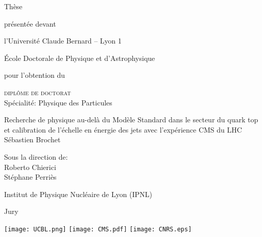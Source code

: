 \begin{titlepage}

\begin{center}
{\Large Thèse\\}

\vspace{1em}

{\small présentée devant\\}

\vspace{1em}

{\Large l'Université Claude Bernard -- Lyon 1\\

\vspace{0.2em}

École Doctorale de Physique et d'Astrophysique\\}

\vspace{2.5em}

pour l'obtention du \\

\vspace{1.5em}

{\Large \textsc{diplôme de doctorat}\\
\small Spécialité: Physique des Particules}

\end{center}

\vspace{2.5em}

\begin{center} \LARGE
Recherche de physique au-delà du Modèle Standard dans le secteur du quark top et calibration de l'échelle en énergie des jets avec l'expérience CMS du LHC\\
\vspace{0.8em}
\Large Sébastien Brochet
\end{center}

\vspace{1.2em}

\begin{center}
\large
Sous la direction de:\\
Roberto Chierici\\
Stéphane Perriès
\end{center}

\begin{center}
\Large Institut de Physique Nucléaire de Lyon (IPNL)
\end{center}

\vspace{2em}

\begin{center}
Jury
\end{center}

\vfill

\begin{center}
\texttt{[image: UCBL.png]} \hspace{1cm}  \hspace{1cm} \texttt{[image: CMS.pdf]} \hspace{1cm} \texttt{[image: CNRS.eps]}
\end{center}

\end{titlepage}
